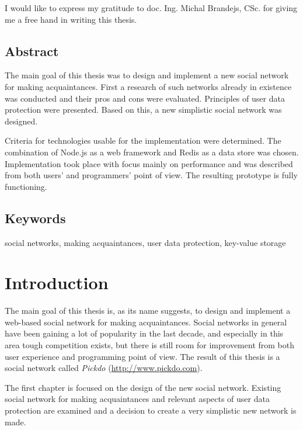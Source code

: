 \documentclass[12pt,oneside]{fithesis}
\begin{document}
\FrontMatter
\ThesisTitlePage

\begin{ThesisDeclaration}
\DeclarationText
\AdvisorName
\end{ThesisDeclaration}

\begin{ThesisThanks}
I would like to express my gratitude to doc. Ing. Michal Brandejs, CSc. for giving me a free hand in writing this thesis.
\end{ThesisThanks}

\section*{Abstract}
	The main goal of this thesis was to design and implement a new social network for making acquaintances. First a research of such networks already in existence was conducted and their pros and cons were evaluated. Principles of user data protection were presented. Based on this, a new simplistic social network was designed.
	
	Criteria for technologies usable for the implementation were determined. The combination of Node.js as a web framework and Redis as a data store was chosen. Implementation took place with focus mainly on performance and was described from both users' and programmers' point of view. The resulting prototype is fully functioning.
\section*{Keywords}
social networks, making acquaintances, user data protection, key-value storage


\MainMatter
\tableofcontents
\chapter*{Introduction}
	The main goal of this thesis is, as its name suggests, to design and implement a web-based social network for making acquaintances. Social networks in general have been gaining a lot of popularity in the last decade, and especially in this area tough competition exists, but there is still room for improvement from both user experience and programming point of view. The result of this thesis is a social network called \emph{Pickdo} (\url{http://www.pickdo.com}).
	
	The first chapter is focused on the design of the new social network. Existing social network for making acquaintances  and relevant aspects of user data protection are examined and a decision to create a very simplistic new network is made.
	
\end{document}
